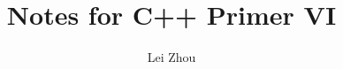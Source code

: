 \documentclass{article}
\begin{document}
\title{Notes for C++ Primer VI}
\author{Lei Zhou}
\maketitle

%

%

%

%

%


\end{document}
